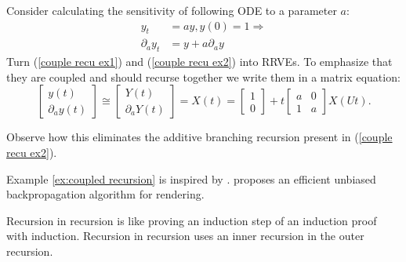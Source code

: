 \documentclass[a4paper,12pt]{article}
\begin{document}
\begin{example} \label{ex:coupled recursion}
    Consider calculating the
    sensitivity of following ODE to a
    parameter $a$:
    \begin{align}
        y_t             & =ay,y(0)=1 \Rightarrow \label{couple recu ex1} \\
        \partial_{a}y_t & = y + a \partial_{a}y \label{couple recu ex2}
    \end{align}
    Turn (\ref{couple recu ex1}) and (\ref{couple recu ex2}) into RRVEs.
    To emphasize that they are coupled and should
    recurse together we write them in a matrix equation:
    \begin{equation} \label{coupled mat}
        \begin{bmatrix}
            y(t) \\
            \partial_{a}y(t)
        \end{bmatrix} \cong
        \begin{bmatrix}
            Y(t) \\
            \partial_{a}Y(t)
        \end{bmatrix}=
        X(t)=
        \begin{bmatrix}
            1 \\
            0
        \end{bmatrix}+
        t \begin{bmatrix}
            a & 0 \\
            1 & a
        \end{bmatrix}
        X(Ut).
    \end{equation}

    Observe how this eliminates the additive branching recursion
    present in (\ref{couple recu ex2}).

\end{example}

\begin{pythonn} 
\end{pythonn}

\begin{related}
    Example \ref{ex:coupled recursion} is inspired by \cite{vicini_path_2021}.
    \cite{vicini_path_2021} proposes an efficient unbiased backpropagation
    algorithm for rendering.
\end{related}

\begin{technique}\label{tech:recu in recu}
    Recursion in recursion is like proving an induction
    step of an induction proof with induction. Recursion in recursion
    uses an inner recursion in the outer recursion.
\end{technique}
\end{document}
